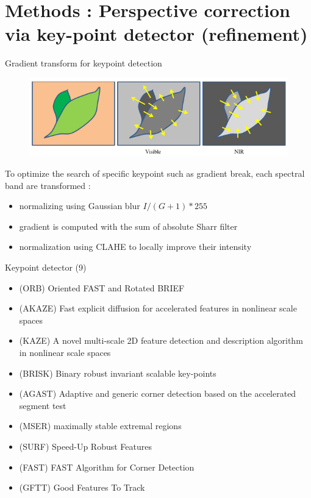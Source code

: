 \documentclass{beamer}
\begin{document}
	\section{Methods : Perspective correction via key-point detector (refinement)}
		\begin{frame}{Gradient transform for keypoint detection}
			\begin{figure}
				\includegraphics[width=0.7\linewidth]{../figures/contrast-inversion.png}
			\end{figure}
			
			To optimize the search of specific keypoint such as gradient break,
			each spectral band are transformed :
			\begin{itemize}
				\item normalizing using Gaussian blur $I/(G+1)*255$ 
				\item gradient is computed with the sum of absolute Sharr filter
				\item normalization using CLAHE to locally improve their intensity
			\end{itemize}
		\end{frame}
	
		\begin{frame}{Keypoint detector (9)}
			\begin{itemize}
				\item (ORB) Oriented FAST and Rotated BRIEF
				\item (AKAZE) Fast explicit diffusion for accelerated features in nonlinear scale spaces
				\item (KAZE) A novel multi-scale 2D feature detection and description algorithm in nonlinear scale spaces
				\item (BRISK) Binary robust invariant scalable key-points
				\item (AGAST) Adaptive and generic corner detection based on the accelerated segment test
				\item (MSER) maximally stable extremal regions
				\item (SURF) Speed-Up Robust Features
				\item (FAST) FAST Algorithm for Corner Detection
				\item (GFTT) Good Features To Track
			\end{itemize}
		\end{frame}
	
\end{document}

